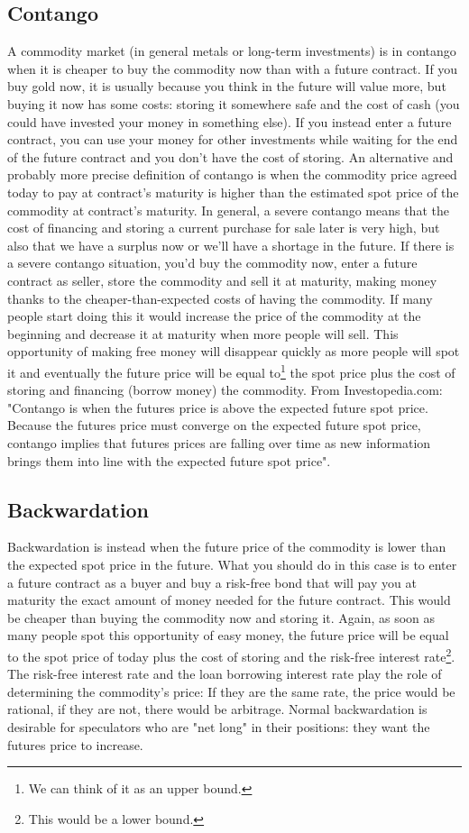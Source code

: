 \subsection{Contango}
A commodity market (in general metals or long-term investments) is in contango when it is cheaper to buy the commodity now than with a future contract. If you buy gold now, it is usually because you think in the future will value more, but buying it now has some costs: storing it somewhere safe and the cost of cash (you could have invested your money in something else). If you instead enter a future contract, you can use your money for other investments while waiting for the end of the future contract and you don't have the cost of storing.
An alternative and probably more precise definition of contango is when the commodity price agreed today to pay at contract's maturity is higher than the estimated spot price of the commodity at contract's maturity. In general, a severe contango means that the cost of financing and storing a current purchase for sale later is very high, but also that we have a surplus now or we'll have a shortage in the future.
If there is a severe contango situation, you'd buy the commodity now, enter a future contract as seller, store the commodity and sell it at maturity, making money thanks to the cheaper-than-expected costs of having the commodity. If many people start doing this it would increase the price of the commodity at the beginning and decrease it at maturity when more people will sell. This opportunity of making free money will disappear quickly as more people will spot it and eventually the future price will be equal to\footnote{We can think of it as an upper bound.} the spot price plus the cost of storing and financing (borrow money) the commodity.
From Investopedia.com: "Contango is when the futures price is above the expected future spot price. Because the futures price must converge on the expected future spot price, contango implies that futures prices are falling over time as new information brings them into line with the expected future spot price".
\subsection{Backwardation}
Backwardation is instead when the future price of the commodity is lower than the expected spot price in the future. What you should do in this case is to enter a future contract as a buyer and buy a risk-free bond that will pay you at maturity the exact amount of money needed for the future contract. This would be cheaper than buying the commodity now and storing it. Again, as soon as many people spot this opportunity of easy money, the future price will be equal to the spot price of today plus the cost of storing and the risk-free interest rate\footnote{This would be a lower bound.}. The risk-free interest rate and the loan borrowing interest rate play the role of determining the commodity's price: If they are the same rate, the price would be rational, if they are not, there would be arbitrage.
Normal backwardation is desirable for speculators who are "net long" in their positions: they want the futures price to increase.

